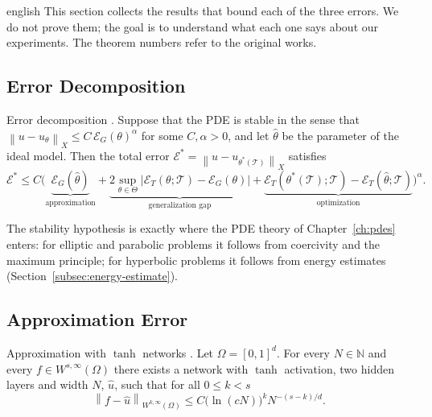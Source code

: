 \documentclass[11pt,letterpaper,twoside,openright]{book} %
\newcommand{\norm}[1]{\left\lVert #1 \right\rVert}
\newcommand{\abs}[1]{\left\lvert #1 \right\rvert}
\newcommand{\T}{\mathcal{T}}
\newif\ifreviewmode
\newcommand{\revtag}[2]{\ifreviewmode{\color{red!70!black}\textsf{\footnotesize[#1#2]}}\fi}
\newcommand{\verificar}[1]{\revtag{VERIFICAR}{: #1}}
\begin{document}
\begin{hyphenrules}{english}
This section collects the results that bound each of the three errors. We do not prove them; the goal
is to understand what each one says about our experiments. The theorem numbers refer to the original
works.\verificar{theorem/lemma numbers against the published versions}

\subsection{Error Decomposition}

\begin{teorema}{Error decomposition \cite[Lemma~3.1 and Eq.~3.11]{deryck2022generic,deryck2024acta}.}\label{thm:error-decomp}
Suppose that the PDE is stable in the sense that $\norm{u-u_\theta}_X\le C\,\mathcal{E}_G(\theta)^{\alpha}$
for some $C,\alpha>0$, and let $\hat\theta$ be the parameter of the ideal model. Then the total error
$\mathcal{E}^{*}=\norm{u-u_{\theta^{*}(\T)}}_X$ satisfies
\[
  \mathcal{E}^{*}\le C\Big(\underbrace{\mathcal{E}_G(\hat\theta)}_{\text{approximation}}
  +\underbrace{2\sup_{\theta\in\Theta}\abs{\mathcal{E}_T(\theta;\T)-\mathcal{E}_G(\theta)}}_{\text{generalization gap}}
  +\underbrace{\mathcal{E}_T(\theta^{*}(\T);\T)-\mathcal{E}_T(\hat\theta;\T)}_{\text{optimization}}\Big)^{\alpha}.
\]
\end{teorema}

The stability hypothesis is exactly where the PDE theory of Chapter~\ref{ch:pdes} enters: for elliptic and
parabolic problems it follows from coercivity and the maximum principle; for hyperbolic problems it
follows from energy estimates (Section~\ref{subsec:energy-estimate}).

\subsection{Approximation Error}

\begin{teorema}{Approximation with $\tanh$ networks \cite[Theorem~4.4]{deryck2021tanh}.}\label{thm:tanh-approx}
Let $\Omega=[0,1]^d$. For every $N\in\mathbb{N}$ and every $f\in W^{s,\infty}(\Omega)$ there exists a network
with $\tanh$ activation, two hidden layers and width $N$, $\hat u$, such that for all $0\le k<s$
\[
  \norm{f-\hat u}_{W^{k,\infty}(\Omega)}\le C\big(\ln(cN)\big)^{k}N^{-(s-k)/d}.
\]
\end{teorema}


\end{hyphenrules}
\end{document}
